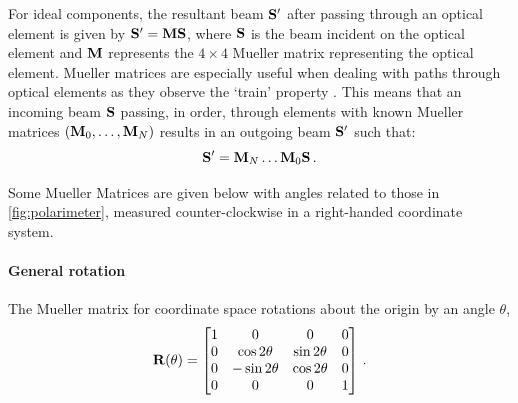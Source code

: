 For ideal components, the resultant beam $\mathbf{S}^{\prime}$ after passing through an optical element is given by $\mathbf{S}^{\prime} = \mathbf{M} \mathbf{S}$, where $\mathbf{S}$ is the beam incident on the optical element and $\mathbf{M}$ represents the $4 \times 4$ Mueller matrix representing the optical element. Mueller matrices are especially useful when dealing with paths through optical elements as they observe the `train' property \citep{Mueller_train}. This means that an incoming beam $\mathbf{S}$ passing, in order, through elements with known Mueller matrices $(\mathbf{M}_{0}, \dots, \mathbf{M}_{N})$ results in an outgoing beam $\mathbf{S}^{\prime}$ such that:
\begin{equation}
    \mathbf{S}^{\prime} = \mathbf{M}_{N} \dots \mathbf{M}_{0} \mathbf{S}\,.\label{eq:mueller_train}
\end{equation}

Some Mueller Matrices are given below with angles related to those in \autoref{fig:polarimeter}, measured counter-clockwise in a right-handed coordinate system.

\paragraph{General rotation}
The Mueller matrix for coordinate space rotations about the origin by an angle $\theta$,
\begin{equation}
    \mathbf{R}(\theta) =
    \begin{bmatrix}
        1 & 0              & 0             & 0 \\
        0 & \cos 2 \theta  & \sin 2 \theta & 0 \\
        0 & -\sin 2 \theta & \cos 2 \theta & 0 \\
        0 & 0              & 0             & 1 \\
    \end{bmatrix}\,.\label{matrix:rotate}
\end{equation}

